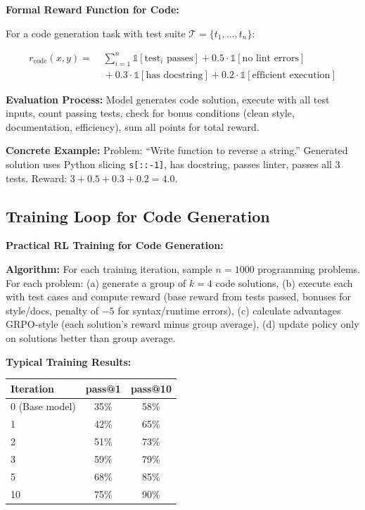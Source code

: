 \begin{chapterenv}
\begin{infobox}
\textbf{Formal Reward Function for Code:}

For a code generation task with test suite $\mathcal{T} = \{t_1, \ldots, t_n\}$:

\begin{align*}
r_{\text{code}}(x, y) =\;& \sum_{i=1}^n \mathbb{1}[\text{test}_i \text{ passes}] + 0.5 \cdot \mathbb{1}[\text{no lint errors}] \\
&{} + 0.3 \cdot \mathbb{1}[\text{has docstring}] + 0.2 \cdot \mathbb{1}[\text{efficient execution}]
\end{align*}

\textbf{Evaluation Process:} Model generates code solution, execute with all test inputs, count passing tests, check for bonus conditions (clean style, documentation, efficiency), sum all points for total reward.

\textbf{Concrete Example:} Problem: ``Write function to reverse a string.'' Generated solution uses Python slicing \texttt{s[::-1]}, has docstring, passes linter, passes all 3 tests. Reward: $3 + 0.5 + 0.3 + 0.2 = 4.0$.
\end{infobox}

\subsection{Training Loop for Code Generation}

\begin{infobox}
\textbf{Practical RL Training for Code Generation:}

\textbf{Algorithm:} For each training iteration, sample $n = 1000$ programming problems. For each problem: (a) generate a group of $k = 4$ code solutions, (b) execute each with test cases and compute reward (base reward from tests passed, bonuses for style/docs, penalty of $-5$ for syntax/runtime errors), (c) calculate advantages GRPO-style (each solution's reward minus group average), (d) update policy only on solutions better than group average.

\textbf{Typical Training Results:}

\begin{center}
\begin{tabular}{lcc}
\toprule
\textbf{Iteration} & \textbf{pass@1} & \textbf{pass@10} \\
\midrule
0 (Base model) & 35\% & 58\% \\
1 & 42\% & 65\% \\
2 & 51\% & 73\% \\
3 & 59\% & 79\% \\
5 & 68\% & 85\% \\
10 & 75\% & 90\% \\
\bottomrule
\end{tabular}
\end{center}


\end{infobox}
\end{chapterenv}
